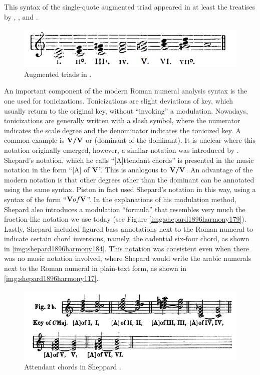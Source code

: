 This syntax of the single-quote augmented triad appeared in at least the treatises by \textcite{broekhoven1889system}, \textcite{buwa1893schule}, and \textcite{shepard1896harmony}.

\begin{figure}
    \centering
    \includegraphics[width=\textwidth]{figures/chapter/2/primary_sources/broekhoven1889system028.png}
    \caption{Augmented triads in \textcite{broekhoven1889system}.}
    \label{fig:broekhoven1889system028}
\end{figure}

An important component of the modern Roman numeral analysis syntax is the one used for tonicizations.
Tonicizations are slight deviations of key, which usually return to the original key, without ``invoking'' a modulation.
Nowadays, tonicizations are generally written with a slash symbol, where the numerator indicates the scale degree and the denominator indicates the tonicized key.
A common example is $\textbf{V}\relax\relax\textbf{/V}\relax\relax$ or (dominant of the dominant).
It is unclear where this notation originally emerged, however, a similar notation was introduced by \textcite{shepard1889how}.
Shepard's notation, which he calls ``[A]ttendant chords'' is presented in the music notation in the form ``[A] of $\textbf{V}\relax\relax$''.
This is analogous to $\textbf{V/V}\relax\relax$.
An advantage of the modern notation is that other degrees other than the dominant can be annotated using the same syntax.
Piston in fact used Shepard's notation in this way, using a syntax of the form ``$\textbf{V}\relax\relax of \textbf{V}\relax\relax$''.
In the explanations of his modulation method, Shepard also introduces a modulation ``formula'' that resembles very much the fraction-like notation we use today (see Figure \ref{img:shepard1896harmony179}).
Lastly, Shepard included figured bass annotations next to the Roman numeral to indicate certain chord inversions, namely, the cadential six-four chord, as shown in \ref{img:shepard1896harmony184}.
This notation was consistent even when there was no music notation involved, where Shepard would write the arabic numerals next to the Roman numeral in plain-text form, as shown in \ref{img:shepard1896harmony117}.

\begin{figure}
    \centering
    \includegraphics[width=\textwidth]{figures/chapter/2/primary_sources/shepard1889how005.png}
    \caption{Attendant chords in Sheppard \textcite{shepard1889how}.}
    \label{fig:shepard1889how005}
\end{figure}

